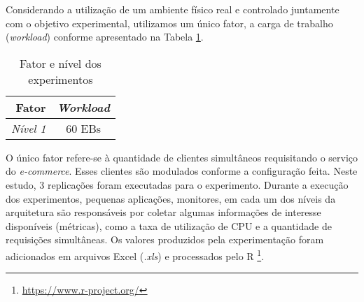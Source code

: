 Considerando a utilização de um ambiente físico real e controlado juntamente com o objetivo experimental, utilizamos um único fator, a carga de trabalho (\textit{workload}) conforme apresentado na Tabela \ref{tab:fatores_niveis}.
\begin{table}[htb]
	\centering
	\caption{Fator e nível dos experimentos}
	\label{tab:fatores_niveis}
	\begin{tabularx}{\textwidth}{|r|c|} \hline\hline
		\textbf{Fator}		& \textbf{\textit{Workload}} \\ \hline
		\textit{Nível 1}	&		60 EBs				 \\		
		\hline
	\end{tabularx}
	\fdadospesquisa
\end{table}

O único fator refere-se à quantidade de clientes simultâneos requisitando o serviço do \textit{e-commerce}. Esses clientes são modulados conforme a configuração feita. Neste estudo, 3 replicações foram executadas para o experimento.
Durante a execução dos experimentos, pequenas aplicações, monitores, em cada um dos níveis da arquitetura são responsáveis por coletar algumas informações de interesse disponíveis (métricas), como a taxa de utilização de CPU e a quantidade de requisições simultâneas. Os valores produzidos pela experimentação foram adicionados em arquivos Excel (\textit{.xls}) e processados pelo R \footnote{\url{https://www.r-project.org/}}.
